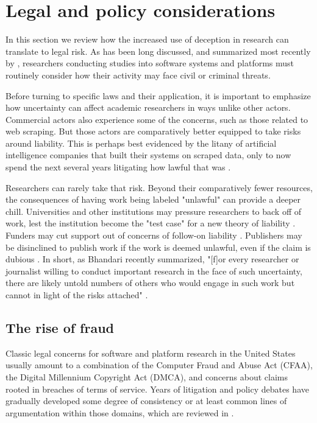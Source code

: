 \section{Legal and policy considerations}
\label{sec:legal}
\label{sec:law}

In this section we review how the increased use of deception in research can translate to legal risk. As has been long discussed, and summarized most recently by \cite{parkResearchersGuideLegal}, researchers conducting studies into software systems and platforms must routinely consider how their activity may face civil or criminal threats.

Before turning to specific laws and their application, it is important to emphasize how uncertainty can affect academic researchers in ways unlike other actors. Commercial actors also experience some of the concerns, such as those related to web scraping. But those actors are comparatively better equipped to take risks around liability. This is perhaps best evidenced by the litany of artificial intelligence companies that built their systems on scraped data, only to now spend the next several years litigating how lawful that was \cite{EthicalTech2023} .

Researchers can rarely take that risk. Beyond their comparatively fewer resources, the consequences of having work being labeled "unlawful" can provide a deeper chill. Universities and other institutions may pressure researchers to back off of work, lest the institution become the "test case" for a new theory of liability \cite{parkResearchersGuideLegal}. Funders may cut support out of concerns of follow-on liability \cite{gilbert2024risks}. Publishers may be disinclined to publish work if the work is deemed unlawful, even if the claim is dubious \cite{mulligan_cybersecurity_2015}. In short, as Bhandari recently summarized, "[f]or every researcher or journalist willing to conduct important research in the face of such uncertainty, there are likely untold numbers of others who would engage in such work but cannot in light of the risks attached" \cite{bhandari2024}.

\subsection{The rise of fraud}
\label{sec:rise_of_fraud}
Classic legal concerns for software and platform research in the United States usually amount to a combination of the Computer Fraud and Abuse Act (CFAA), the Digital Millennium Copyright Act (DMCA), and concerns about claims rooted in breaches of terms of service. Years of litigation and policy debates have gradually developed some degree of consistency or at least common lines of argumentation within those domains, which are reviewed in .

